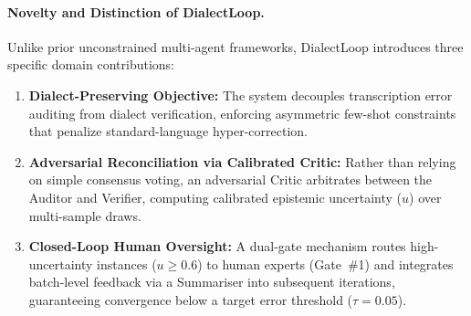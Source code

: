 \paragraph{Novelty and Distinction of DialectLoop.}
Unlike prior unconstrained multi-agent frameworks, DialectLoop introduces three specific domain contributions:
\begin{enumerate}
    \item \textbf{Dialect-Preserving Objective:} The system decouples transcription error auditing from dialect verification, enforcing asymmetric few-shot constraints that penalize standard-language hyper-correction.
    \item \textbf{Adversarial Reconciliation via Calibrated Critic:} Rather than relying on simple consensus voting, an adversarial Critic arbitrates between the Auditor and Verifier, computing calibrated epistemic uncertainty ($u$) over multi-sample draws.
    \item \textbf{Closed-Loop Human Oversight:} A dual-gate mechanism routes high-uncertainty instances ($u \ge 0.6$) to human experts (Gate~\#1) and integrates batch-level feedback via a Summariser into subsequent iterations, guaranteeing convergence below a target error threshold ($\tau = 0.05$).
\end{enumerate}
